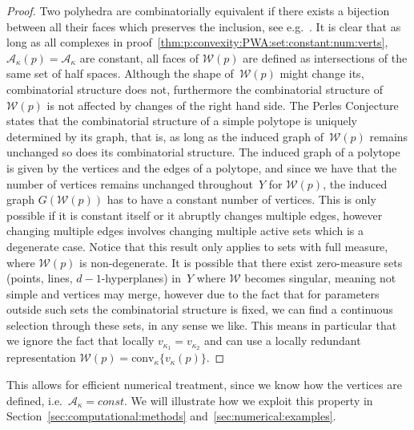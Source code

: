 \documentclass[final]{elsarticle}
\providecommand{\conv}{\text{conv}}
\theoremstyle{remark}
\theoremstyle{definition}
\begin{document}
\begin{proof}
Two polyhedra are combinatorially equivalent if there exists a bijection between all their faces which preserves the inclusion, see e.g.~\cite{Ziegler:1995}.
%
It is clear that as long as all complexes in proof~\ref{thm:p:convexity:PWA:set:constant:num:verts}, $\mathcal A_\kappa(p)=\mathcal A_\kappa$ are constant, all faces of $\mathcal W(p)$ are defined as intersections of the same set of half spaces.
%
Although the shape of~$\mathcal W(p)$ might change its, combinatorial structure does not, furthermore the combinatorial structure of $\mathcal W(p)$ is not affected by changes of the right hand side.
%
The Perles Conjecture~\cite{Kalai:1988} states that the combinatorial structure of a simple polytope is uniquely determined by its graph, that is, as long as the induced graph of~$\mathcal W(p)$ remains unchanged so does its combinatorial structure.
%
The induced graph of a polytope is given by the vertices and the edges of a polytope, and since we have that the number of vertices remains unchanged throughout~$Y$ for $\mathcal W(p)$, the induced graph $G(\mathcal W(p))$ has to have a constant number of vertices.
%
This is only possible if it is constant itself or it abruptly changes multiple edges, however changing multiple edges involves changing multiple active sets which is a degenerate case.
%
Notice that this result only applies to sets with full measure, where $\mathcal W(p)$ is non-degenerate.
%
It is possible that there exist zero-measure sets (points, lines, $d-1$-hyperplanes) in~$Y$ where $\mathcal W$ becomes singular, meaning not simple
and vertices may merge, however due to the fact that for parameters outside such sets the combinatorial structure is fixed, we can find a  continuous selection through these sets, in any sense we like.
%
This means in particular that we ignore the fact that locally $v_{\kappa_1}=v_{\kappa_2}$ and can
 use a locally redundant representation $\mathcal W(p) = \conv_\kappa\{v_\kappa(p)\}$.
\end{proof}
%
This allows for efficient numerical treatment, since we know how the vertices are defined, i.e.~$\mathcal A_\kappa = const$.
%
We will illustrate how we exploit this property in Section~\ref{sec:computational:methods} and~\ref{sec:numerical:examples}.
%
\end{document}
